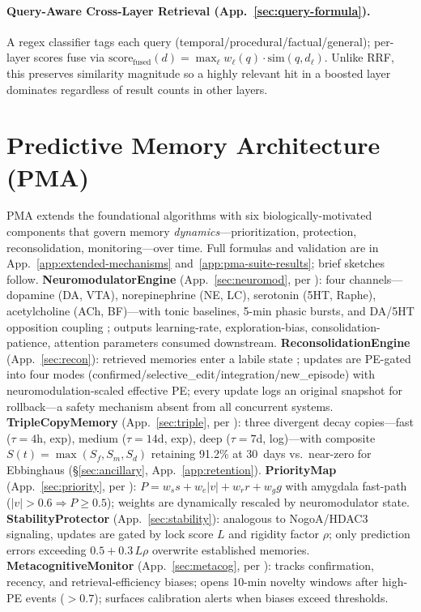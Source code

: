 \documentclass{article}
\begin{document}
\paragraph{Query-Aware Cross-Layer Retrieval (App.~\ref{sec:query-formula}).}
A regex classifier tags each query (temporal/procedural/factual/general);
per-layer scores fuse via
$\mathrm{score}_{\text{fused}}(d)=\max_\ell w_\ell(q)\cdot\mathrm{sim}(q,d_\ell)$.
Unlike RRF, this preserves similarity magnitude so a highly relevant
hit in a boosted layer dominates regardless of result counts in other
layers.

\section{Predictive Memory Architecture (PMA)}
\label{sec:pma}

PMA extends the foundational algorithms with six biologically-motivated
components that govern memory \emph{dynamics}---prioritization,
protection, reconsolidation, monitoring---over time. Full formulas and
validation are in App.~\ref{app:extended-mechanisms} and~\ref{app:pma-suite-results};
brief sketches follow.
\textbf{NeuromodulatorEngine} (App.~\ref{sec:neuromod}, per \citealp{dayan2012}):
four channels---dopamine (DA, VTA), norepinephrine (NE, LC),
serotonin (5HT, Raphe), acetylcholine (ACh, BF)---with tonic
baselines, 5-min phasic bursts, and DA/5HT opposition coupling
\citep{daw2002}; outputs learning-rate, exploration-bias,
consolidation-patience, attention parameters consumed downstream.
\textbf{ReconsolidationEngine} (App.~\ref{sec:recon}): retrieved
memories enter a labile state \citep{nader2000,nader2009}; updates are
PE-gated into four modes (confirmed/selective\_edit/integration/new\_episode)
with neuromodulation-scaled effective PE; every update logs an
original snapshot for rollback---a safety mechanism absent from all
concurrent systems.
\textbf{TripleCopyMemory} (App.~\ref{sec:triple}, per \citealp{basel2024,kumaran2016}):
three divergent decay copies---fast ($\tau{=}4$h, exp), medium
($\tau{=}14$d, exp), deep ($\tau{=}7$d, log)---with composite
$S(t){=}\max(S_f,S_m,S_d)$ retaining 91.2\% at 30~days vs.\ near-zero
for Ebbinghaus (\S\ref{sec:ancillary}, App.~\ref{app:retention}).
\textbf{PriorityMap} (App.~\ref{sec:priority}, per \citealp{chelazzi2014}):
$P{=}w_s s + w_e|v| + w_r r + w_g g$ with amygdala fast-path
($|v|{>}0.6 \Rightarrow P{\geq}0.5$); weights are dynamically rescaled
by neuromodulator state.
\textbf{StabilityProtector} (App.~\ref{sec:stability}): analogous to
NogoA/HDAC3 signaling, updates are gated by lock score $L$ and
rigidity factor $\rho$; only prediction errors exceeding
$0.5{+}0.3\,L\rho$ overwrite established memories.
\textbf{MetacognitiveMonitor} (App.~\ref{sec:metacog}, per \citealp{fleming2012}):
tracks confirmation, recency, and retrieval-efficiency biases; opens
10-min novelty windows after high-PE events ($>{0.7}$); surfaces
calibration alerts when biases exceed thresholds.
\end{document}
